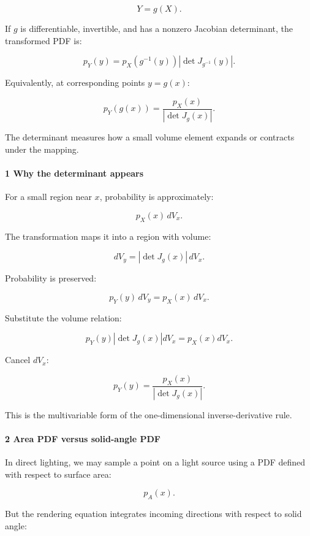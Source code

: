 \[
 Y=g(X).
\]

If \(g\) is differentiable, invertible, and has a nonzero Jacobian determinant, the transformed PDF is:

\[
 \boxed{ p_Y(y) = p_X(g^{-1}(y)) \left|\det J_{g^{-1}}(y)\right| }.
\]

Equivalently, at corresponding points \(y=g(x)\):

\[
 \boxed{ p_Y(g(x)) = \frac{p_X(x)}{|\det J_g(x)|} }.
\]

The determinant measures how a small volume element expands or contracts under the mapping.

\paragraph{1 Why the determinant appears}\label{02-foundations-ii-ch029-why-the-determinant-appears}

\hypertarget{02-foundations-ii-ch029-why-the-determinant-appears}{}

For a small region near \(x\), probability is approximately:

\[
 p_X(x)\,dV_x.
\]

The transformation maps it into a region with volume:

\[
 dV_y= |\det J_g(x)|\,dV_x.
\]

Probability is preserved:

\[
 p_Y(y)\,dV_y=p_X(x)\,dV_x.
\]

Substitute the volume relation:

\[
 p_Y(y) |\det J_g(x)|dV_x = p_X(x)dV_x.
\]

Cancel \(dV_x\):

\[
 p_Y(y)= \frac{p_X(x)}{|\det J_g(x)|}.
\]

This is the multivariable form of the one-dimensional inverse-derivative rule.

\paragraph{2 Area PDF versus solid-angle PDF}\label{02-foundations-ii-ch029-area-pdf-versus-solid-angle-pdf}

\hypertarget{02-foundations-ii-ch029-area-pdf-versus-solid-angle-pdf}{}

In direct lighting, we may sample a point on a light source using a PDF defined with respect to surface area:

\[
 p_A(x).
\]

But the rendering equation integrates incoming directions with respect to solid angle:

